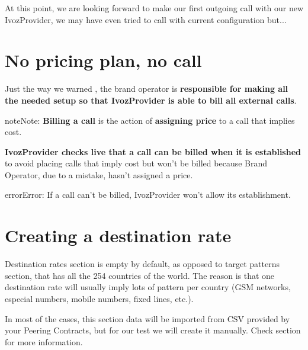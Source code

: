 \documentclass[letterpaper,10pt,english]{sphinxmanual}
\begin{document}
At this point, we are looking forward to make our first outgoing call with our
new IvozProvider, we may have even tried to call with current configuration but...


\section{No pricing plan, no call}
\label{getting_started/external_outgoing_calls/noplan_nocall:noplan-nocall}\label{getting_started/external_outgoing_calls/noplan_nocall::doc}\label{getting_started/external_outgoing_calls/noplan_nocall:no-pricing-plan-no-call}
Just the way we warned {\hyperref[basics/operation_roles/index:brand\string-responsibilities]{}}, the brand operator is \textbf{responsible for making all the
needed setup so that IvozProvider is able to bill all external calls}.

\begin{notice}{note}{Note:}
\textbf{Billing a call} is the action of \textbf{assigning price} to a call that implies
cost.
\end{notice}

\textbf{IvozProvider checks live that a call can be billed when it is established} to avoid
placing calls that imply cost but won't be billed because Brand Operator, due to
a mistake, hasn't assigned a price.

\begin{notice}{error}{Error:}
If a call can't be billed, IvozProvider won't allow its establishment.
\end{notice}


\section{Creating a destination rate}
\label{getting_started/external_outgoing_calls/destination_rate:creating-a-destination-rate}\label{getting_started/external_outgoing_calls/destination_rate::doc}
Destination rates section is empty by default, as opposed to target patterns section,
that has all the 254 countries of the world. The reason is that one destination rate
will usually imply lots of pattern per country (GSM networks, especial numbers,
mobile numbers, fixed lines, etc.).

In most of the cases, this section data will be imported from CSV provided by your
Peering Contracts, but for our test we will create it manually. Check section
{\hyperref[brand/billing/destination_rates:destination\string-rates]{}} for more information.
\end{document}
